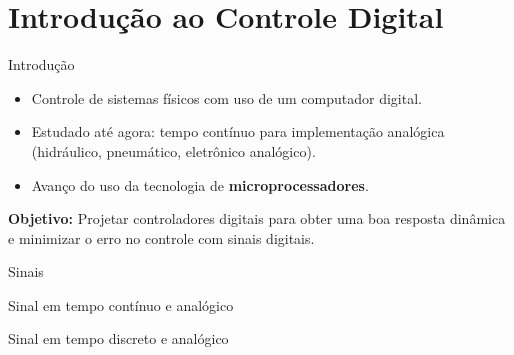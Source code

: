 \section{Introdução ao Controle Digital}

\begin{frame}{Introdução}
\begin{block}{}
\begin{itemize}
	\item Controle de sistemas físicos com uso de um computador digital.
	\item Estudado até agora: tempo contínuo para implementação analógica (hidráulico, pneumático, eletrônico analógico).
	\item Avanço do uso da tecnologia de \textbf{microprocessadores}.
\end{itemize}

\textbf{Objetivo:} Projetar controladores digitais para obter uma boa resposta dinâmica e minimizar o erro no controle com sinais digitais.

\end{block}
\end{frame}

\begin{frame}{Sinais}

\begin{minipage}{0.48\linewidth}
	\centering
	
	\scalebox{0.5}{}
	
	Sinal em tempo contínuo e analógico
\end{minipage}
\hfill
\begin{minipage}{0.48\linewidth}
	\centering
	
	\scalebox{0.5}{}
	
	Sinal em tempo discreto e analógico
\end{minipage}

	
\end{frame}


